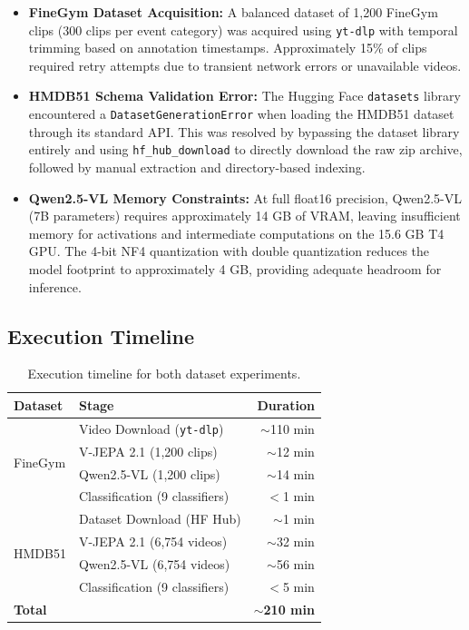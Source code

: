 \begin{itemize}[leftmargin=*]
    \item \textbf{FineGym Dataset Acquisition:} A balanced dataset of 1,200 FineGym clips (300 clips per event category) was acquired using \texttt{yt-dlp} with temporal trimming based on annotation timestamps. Approximately 15\% of clips required retry attempts due to transient network errors or unavailable videos.
    \item \textbf{HMDB51 Schema Validation Error:} The Hugging Face \texttt{datasets} library encountered a \texttt{DatasetGenerationError} when loading the HMDB51 dataset through its standard API. This was resolved by bypassing the dataset library entirely and using \texttt{hf\_hub\_download} to directly download the raw zip archive, followed by manual extraction and directory-based indexing.
    \item \textbf{Qwen2.5-VL Memory Constraints:} At full float16 precision, Qwen2.5-VL (7B parameters) requires approximately 14 GB of VRAM, leaving insufficient memory for activations and intermediate computations on the 15.6 GB T4 GPU. The 4-bit NF4 quantization with double quantization reduces the model footprint to approximately 4 GB, providing adequate headroom for inference.
\end{itemize}

\subsection{Execution Timeline}

\begin{table}[H]
\centering
\caption{Execution timeline for both dataset experiments.}
\label{tab:execution_timeline}
\begin{tabular}{llr}
\toprule
\textbf{Dataset} & \textbf{Stage} & \textbf{Duration} \\
\midrule
\multirow{4}{*}{FineGym} & Video Download (\texttt{yt-dlp}) & $\sim$110 min \\
 & V-JEPA 2.1 (1,200 clips) & $\sim$12 min \\
 & Qwen2.5-VL (1,200 clips) & $\sim$14 min \\
 & Classification (9 classifiers) & $<$1 min \\
\midrule
\multirow{4}{*}{HMDB51} & Dataset Download (HF Hub) & $\sim$1 min \\
 & V-JEPA 2.1 (6,754 videos) & $\sim$32 min \\
 & Qwen2.5-VL (6,754 videos) & $\sim$56 min \\
 & Classification (9 classifiers) & $<$5 min \\
\midrule
\textbf{Total} & & \textbf{$\sim$210 min} \\
\bottomrule
\end{tabular}
\end{table}

